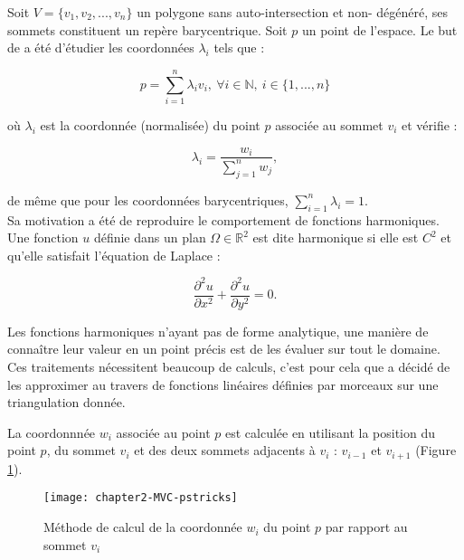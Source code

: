 Soit $V = \{v_1, v_2, ..., v_n\}$ un polygone sans auto-intersection et non-
dégénéré, ses sommets constituent un repère barycentrique. Soit $p$ un point
de l'espace. Le but de \cite{Flo03} a été d'étudier les coordonnées
$\lambda_i$ tels que :

\begin{equation}
  p = \sum_{i=1}^{n} \lambda_i v_i ,
  ~ \forall i \in \mathbb{N} ,~ i \in \{1,\text{...}, n\}
\end{equation}

où $\lambda_i$ est la coordonnée (normalisée) du point $p$ associée au sommet
$v_i$ et vérifie :

\begin{equation}
  \lambda_i = \frac{w_i}{\sum_{j=1}^n w_j},
\end{equation}

de même que pour les coordonnées barycentriques, $\sum_{i=1}^n \lambda_i = 1$.
\\

Sa motivation a été de reproduire le comportement de fonctions harmoniques.
Une fonction $u$ définie dans un plan $\Omega \in \mathbb{R}^2$ est dite
harmonique si elle est $C^2$ et qu'elle satisfait l'équation de Laplace :

\begin{equation}
  \frac{\partial^2 u}{\partial x^2} + \frac{\partial^2 u}{\partial y^2} = 0.
\end{equation}

Les fonctions harmoniques n'ayant pas de forme analytique, une manière de
connaître leur valeur en un point précis est de les évaluer sur tout le
domaine. Ces traitements nécessitent beaucoup de calculs, c'est pour cela que
\cite{Flo03} a décidé de les approximer au travers de fonctions linéaires
définies par morceaux sur une triangulation donnée.

La coordonnnée $w_i$ associée au point $p$ est calculée en utilisant la
position du point $p$, du sommet $v_i$ et des deux sommets adjacents à $v_i$ :
$v_{i-1}$ et $v_{i+1}$ (Figure \ref{DEFcal}).

\begin{figure}[ht]
  \begin{center}
    \texttt{[image: chapter2-MVC-pstricks]}

    \caption[Méthode de calcul MVC] {Méthode de calcul de la coordonnée $w_i$
du point $p$ par rapport au sommet $v_i$}

    \label{DEFcal}   \end{center} \end{figure}

